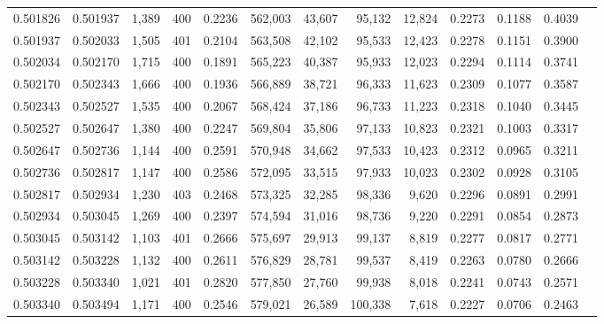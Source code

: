 \begin{tabular}{rrrrrrrrrrrrr}
0.501826 & 0.501937 & 1,389 & 400 &                                     0.2236 & 562,003 &  43,607 &  95,132 &  12,824 & 0.2273 & 0.1188 & 0.4039 \\
0.501937 & 0.502033 & 1,505 & 401 &                                     0.2104 & 563,508 &  42,102 &  95,533 &  12,423 & 0.2278 & 0.1151 & 0.3900 \\
0.502034 & 0.502170 & 1,715 & 400 &                                     0.1891 & 565,223 &  40,387 &  95,933 &  12,023 & 0.2294 & 0.1114 & 0.3741 \\
0.502170 & 0.502343 & 1,666 & 400 &                                     0.1936 & 566,889 &  38,721 &  96,333 &  11,623 & 0.2309 & 0.1077 & 0.3587 \\
0.502343 & 0.502527 & 1,535 & 400 &                                     0.2067 & 568,424 &  37,186 &  96,733 &  11,223 & 0.2318 & 0.1040 & 0.3445 \\
0.502527 & 0.502647 & 1,380 & 400 &                                     0.2247 & 569,804 &  35,806 &  97,133 &  10,823 & 0.2321 & 0.1003 & 0.3317 \\
0.502647 & 0.502736 & 1,144 & 400 &                                     0.2591 & 570,948 &  34,662 &  97,533 &  10,423 & 0.2312 & 0.0965 & 0.3211 \\
0.502736 & 0.502817 & 1,147 & 400 &                                     0.2586 & 572,095 &  33,515 &  97,933 &  10,023 & 0.2302 & 0.0928 & 0.3105 \\
0.502817 & 0.502934 & 1,230 & 403 &                                     0.2468 & 573,325 &  32,285 &  98,336 &   9,620 & 0.2296 & 0.0891 & 0.2991 \\
0.502934 & 0.503045 & 1,269 & 400 &                                     0.2397 & 574,594 &  31,016 &  98,736 &   9,220 & 0.2291 & 0.0854 & 0.2873 \\
0.503045 & 0.503142 & 1,103 & 401 &                                     0.2666 & 575,697 &  29,913 &  99,137 &   8,819 & 0.2277 & 0.0817 & 0.2771 \\
0.503142 & 0.503228 & 1,132 & 400 &                                     0.2611 & 576,829 &  28,781 &  99,537 &   8,419 & 0.2263 & 0.0780 & 0.2666 \\
0.503228 & 0.503340 & 1,021 & 401 &                                     0.2820 & 577,850 &  27,760 &  99,938 &   8,018 & 0.2241 & 0.0743 & 0.2571 \\
0.503340 & 0.503494 & 1,171 & 400 &                                     0.2546 & 579,021 &  26,589 & 100,338 &   7,618 & 0.2227 & 0.0706 & 0.2463 \\

\end{tabular}
